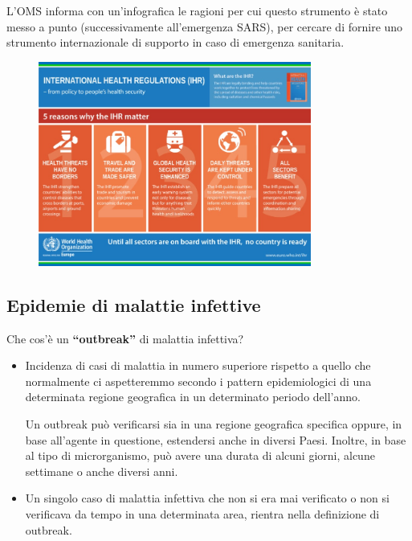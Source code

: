L'OMS informa con un'infografica le ragioni per cui questo strumento è
stato messo a punto (successivamente all'emergenza SARS), per cercare di
fornire uno strumento internazionale di supporto in caso di emergenza
sanitaria.

\begin{figure}[!ht]
\centering
	\includegraphics[width=0.8\textwidth]{26/image6.jpeg}
	\end{figure}

\subsection{Epidemie di malattie infettive}

Che cos'è un \textbf{``outbreak''} di malattia infettiva?

\begin{itemize}
\item
  Incidenza di casi di malattia in numero superiore rispetto a quello
  che normalmente ci aspetteremmo secondo i pattern epidemiologici di
  una determinata regione geografica in un determinato periodo
  dell'anno.

Un outbreak può verificarsi sia in una regione geografica specifica
oppure, in base all'agente in questione, estendersi anche in diversi
Paesi. Inoltre, in base al tipo di microrganismo, può avere una durata
di alcuni giorni, alcune settimane o anche diversi anni.

\item
  Un singolo caso di malattia infettiva che non si era mai verificato o
  non si verificava da tempo in una determinata area, rientra nella
  definizione di outbreak.
  
\end{itemize}

